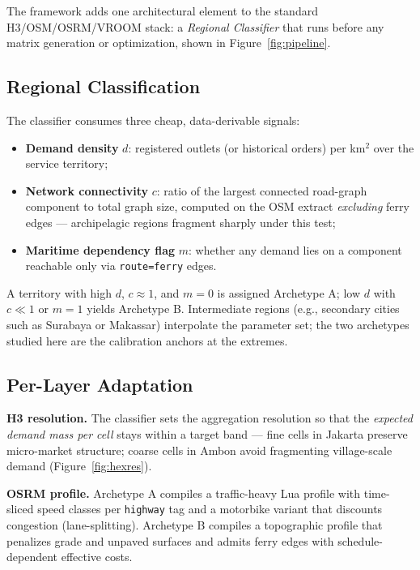 \documentclass[11pt,a4paper,twocolumn]{article}
\begin{document}
The framework adds one architectural element to the standard
H3/OSM/OSRM/VROOM stack: a \emph{Regional Classifier} that runs before any
matrix generation or optimization, shown in Figure~\ref{fig:pipeline}.

\subsection{Regional Classification}

The classifier consumes three cheap, data-derivable signals:

\begin{itemize}[leftmargin=1.3em, itemsep=0.1em]
  \item \textbf{Demand density} $d$: registered outlets (or historical
    orders) per km$^2$ over the service territory;
  \item \textbf{Network connectivity} $c$: ratio of the largest connected
    road-graph component to total graph size, computed on the OSM extract
    \emph{excluding} ferry edges --- archipelagic regions fragment sharply
    under this test;
  \item \textbf{Maritime dependency flag} $m$: whether any demand lies on a
    component reachable only via \texttt{route=ferry} edges.
\end{itemize}

A territory with high $d$, $c \approx 1$, and $m = 0$ is assigned Archetype
A; low $d$ with $c \ll 1$ or $m = 1$ yields Archetype B. Intermediate
regions (e.g., secondary cities such as Surabaya or Makassar) interpolate
the parameter set; the two archetypes studied here are the calibration
anchors at the extremes.

\subsection{Per-Layer Adaptation}

\textbf{H3 resolution.} The classifier sets the aggregation resolution so
that the \emph{expected demand mass per cell} stays within a target band
--- fine cells in Jakarta preserve micro-market structure; coarse cells in
Ambon avoid fragmenting village-scale demand
(Figure~\ref{fig:hexres}).

\textbf{OSRM profile.} Archetype A compiles a traffic-heavy Lua profile
with time-sliced speed classes per \texttt{highway} tag and a motorbike
variant that discounts congestion (lane-splitting). Archetype B compiles a
topographic profile that penalizes grade and unpaved surfaces and admits
ferry edges with schedule-dependent effective costs.
\end{document}
